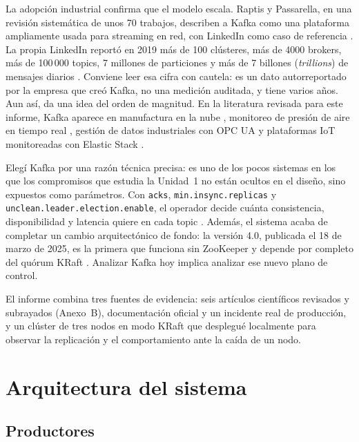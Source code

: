 \documentclass[11pt,a4paper]{article}
\begin{document}
La adopción industrial confirma que el modelo escala. Raptis y Passarella, en una revisión sistemática de unos 70 trabajos, describen a Kafka como una plataforma ampliamente usada para streaming en red, con LinkedIn como caso de referencia \cite{raptis2023survey}. La propia LinkedIn reportó en 2019 más de 100 clústeres, más de 4000 brokers, más de 100\,000 topics, 7 millones de particiones y más de 7 billones (\emph{trillions}) de mensajes diarios \cite{linkedin2019}. Conviene leer esa cifra con cautela: es un dato autorreportado por la empresa que creó Kafka, no una medición auditada, y tiene varios años. Aun así, da una idea del orden de magnitud. En la literatura revisada para este informe, Kafka aparece en manufactura en la nube \cite{pacella2025scalable}, monitoreo de presión de aire en tiempo real \cite{zhou2024distributed}, gestión de datos industriales con OPC UA \cite{lu2025proposal} y plataformas IoT monitoreadas con Elastic Stack \cite{calderon2024monitoring}.

Elegí Kafka por una razón técnica precisa: es uno de los pocos sistemas en los que los compromisos que estudia la Unidad~1 no están ocultos en el diseño, sino expuestos como parámetros. Con \texttt{acks}, \texttt{min.insync.replicas} y \texttt{unclean.leader.election.enable}, el operador decide cuánta consistencia, disponibilidad y latencia quiere en cada topic \cite{kafkadocs}. Además, el sistema acaba de completar un cambio arquitectónico de fondo: la versión 4.0, publicada el 18 de marzo de 2025, es la primera que funciona sin ZooKeeper y depende por completo del quórum KRaft \cite{kafka40release}. Analizar Kafka hoy implica analizar ese nuevo plano de control.

El informe combina tres fuentes de evidencia: seis artículos científicos revisados y subrayados (Anexo~B), documentación oficial y un incidente real de producción, y un clúster de tres nodos en modo KRaft que desplegué localmente para observar la replicación y el comportamiento ante la caída de un nodo.

\section{Arquitectura del sistema}
\label{sec:arquitectura}

\subsection{Productores}
\end{document}
